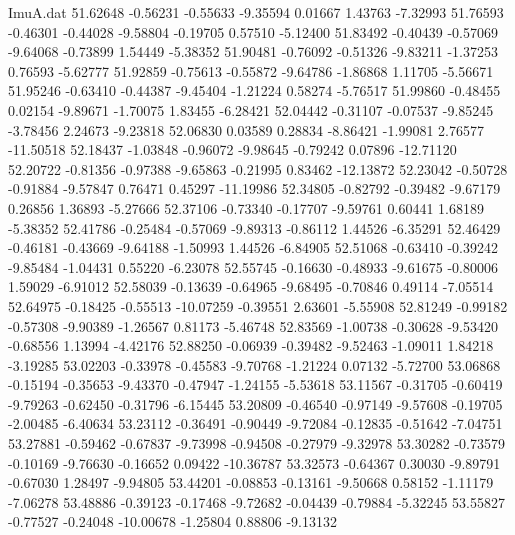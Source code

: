 \begin{filecontents}{ImuA.dat}
  51.62648   -0.56231   -0.55633   -9.35594    0.01667    1.43763   -7.32993
  51.76593   -0.46301   -0.44028   -9.58804   -0.19705    0.57510   -5.12400
  51.83492   -0.40439   -0.57069   -9.64068   -0.73899    1.54449   -5.38352
  51.90481   -0.76092   -0.51326   -9.83211   -1.37253    0.76593   -5.62777
  51.92859   -0.75613   -0.55872   -9.64786   -1.86868    1.11705   -5.56671
  51.95246   -0.63410   -0.44387   -9.45404   -1.21224    0.58274   -5.76517
  51.99860   -0.48455    0.02154   -9.89671   -1.70075    1.83455   -6.28421
  52.04442   -0.31107   -0.07537   -9.85245   -3.78456    2.24673   -9.23818
  52.06830    0.03589    0.28834   -8.86421   -1.99081    2.76577  -11.50518
  52.18437   -1.03848   -0.96072   -9.98645   -0.79242    0.07896  -12.71120
  52.20722   -0.81356   -0.97388   -9.65863   -0.21995    0.83462  -12.13872
  52.23042   -0.50728   -0.91884   -9.57847    0.76471    0.45297  -11.19986
  52.34805   -0.82792   -0.39482   -9.67179    0.26856    1.36893   -5.27666
  52.37106   -0.73340   -0.17707   -9.59761    0.60441    1.68189   -5.38352
  52.41786   -0.25484   -0.57069   -9.89313   -0.86112    1.44526   -6.35291
  52.46429   -0.46181   -0.43669   -9.64188   -1.50993    1.44526   -6.84905
  52.51068   -0.63410   -0.39242   -9.85484   -1.04431    0.55220   -6.23078
  52.55745   -0.16630   -0.48933   -9.61675   -0.80006    1.59029   -6.91012
  52.58039   -0.13639   -0.64965   -9.68495   -0.70846    0.49114   -7.05514
  52.64975   -0.18425   -0.55513  -10.07259   -0.39551    2.63601   -5.55908
  52.81249   -0.99182   -0.57308   -9.90389   -1.26567    0.81173   -5.46748
  52.83569   -1.00738   -0.30628   -9.53420   -0.68556    1.13994   -4.42176
  52.88250   -0.06939   -0.39482   -9.52463   -1.09011    1.84218   -3.19285
  53.02203   -0.33978   -0.45583   -9.70768   -1.21224    0.07132   -5.72700
  53.06868   -0.15194   -0.35653   -9.43370   -0.47947   -1.24155   -5.53618
  53.11567   -0.31705   -0.60419   -9.79263   -0.62450   -0.31796   -6.15445
  53.20809   -0.46540   -0.97149   -9.57608   -0.19705   -2.00485   -6.40634
  53.23112   -0.36491   -0.90449   -9.72084   -0.12835   -0.51642   -7.04751
  53.27881   -0.59462   -0.67837   -9.73998   -0.94508   -0.27979   -9.32978
  53.30282   -0.73579   -0.10169   -9.76630   -0.16652    0.09422  -10.36787
  53.32573   -0.64367    0.30030   -9.89791   -0.67030    1.28497   -9.94805
  53.44201   -0.08853   -0.13161   -9.50668    0.58152   -1.11179   -7.06278
  53.48886   -0.39123   -0.17468   -9.72682   -0.04439   -0.79884   -5.32245
  53.55827   -0.77527   -0.24048  -10.00678   -1.25804    0.88806   -9.13132

\end{filecontents}
